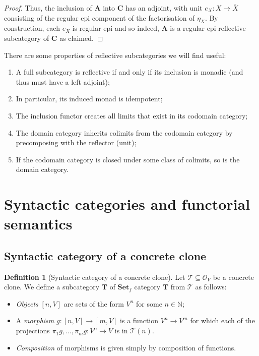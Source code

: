 \documentclass[11pt, a4paper, twoside,leqno]{amsart}
\newcommand{\cat}[1]{\mathbf{#1}}
\renewcommand{\O}{{\mathcal O}}
\numberwithin{equation}{section}
\theoremstyle{plain}
\theoremstyle{definition}
\newtheorem{Defn}[Thm]{Definition}
\begin{document}
\begin{proof}
  Thus, the inclusion of \(\cat{A}\) into
  \(\cat{C}\) has an adjoint, with unit \(e_{X} \colon X \rightarrow
  \overline{X}\) consisting of the regular epi component of
  the factorisation of \(\eta_{X}\). By construction, each \(e_{X}\)
  is regular epi and so indeed, \(\cat{A}\) is a regular epi-reflective subcategory of \(\cat{C}\) as claimed.
\end{proof}

There are some properties of reflective subcategories we will find
useful:

\begin{enumerate}[label=(\roman*), ref= (\roman*)]
\item
  \label{it:reflection-monadic}
  A full subcategory is reflective if and only if its inclusion is monadic
  (and thus must have a left
  adjoint);
\item
  \label{it:reflection-idempotent}
  In particular, its
  induced monad is idempotent;

\item
  \label{it:reflection-lims}
  The inclusion functor creates all limits that exist in its
  codomain category;
\item
  \label{it:reflection-colims}
  The domain category inherits colimits from the codomain
  category by precomposing with the reflector (unit);
\item
  \label{it:reflection-co-completeness}
  If the codomain category is closed under some class of colimits, so
  is the domain category. 
\end{enumerate}

\section{Syntactic categories and functorial semantics}
\label{sec:via-syntactic-cats}

\subsection{Syntactic category of a concrete clone}
\label{sec:clone-cat}

\begin{Defn}[Syntactic category of a concrete clone]
  \label{def:cc-abstract-clone}
  Let \(\mathscr{T} 
  \subseteq \O_{V}\) be a concrete clone. We define a
  subcategory \(\cat{T}\) of $\cat{Set}_f$ category \(\cat{T}\) from \(\mathscr{T} 
  \) as follows:
  \begin{itemize}
  \item \emph{Objects} $[n,V]$ are sets of the form $V^n$ for some $n
    \in \mathbb{N}$;
  \item A \emph{morphism} $g \colon [n,V] \rightarrow [m,V]$ is a
    function $V^n \rightarrow V^m$ for which each of the projections $\pi_1 g, \dots, \pi_m g \colon V^n
    \rightarrow V$ is in $\mathscr{T}(n)$.
  \item \emph{Composition} of morphisms is given simply by composition of functions.
  \end{itemize}
\end{Defn}
\end{document}
